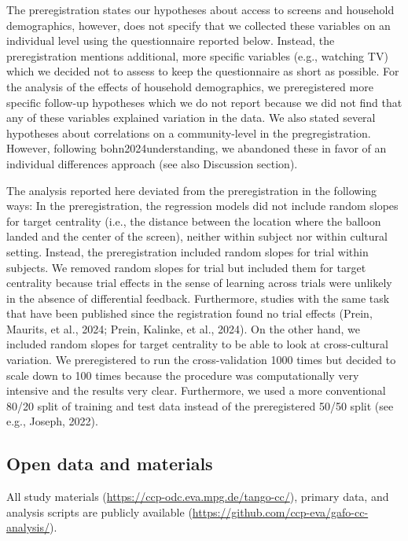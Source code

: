 \documentclass[
  man,floatsintext]{apa7}
\begin{document}
The preregistration states our hypotheses about access to screens and household demographics, however, does not specify that we collected these variables on an individual level using the questionnaire reported below. Instead, the preregistration mentions additional, more specific variables (e.g., watching TV) which we decided not to assess to keep the questionnaire as short as possible. For the analysis of the effects of household demographics, we preregistered more specific follow-up hypotheses which we do not report because we did not find that any of these variables explained variation in the data. We also stated several hypotheses about correlations on a community-level in the pregregistration. However, following bohn2024understanding, we abandoned these in favor of an individual differences approach (see also Discussion section).

The analysis reported here deviated from the preregistration in the following ways: In the preregistration, the regression models did not include random slopes for target centrality (i.e., the distance between the location where the balloon landed and the center of the screen), neither within subject nor within cultural setting. Instead, the preregistration included random slopes for trial within subjects. We removed random slopes for trial but included them for target centrality because trial effects in the sense of learning across trials were unlikely in the absence of differential feedback. Furthermore, studies with the same task that have been published since the registration found no trial effects (Prein, Maurits, et al., 2024; Prein, Kalinke, et al., 2024). On the other hand, we included random slopes for target centrality to be able to look at cross-cultural variation. We preregistered to run the cross-validation 1000 times but decided to scale down to 100 times because the procedure was computationally very intensive and the results very clear. Furthermore, we used a more conventional 80/20 split of training and test data instead of the preregistered 50/50 split (see e.g., Joseph, 2022).

\subsection{Open data and materials}\label{open-data-and-materials}

All study materials (\url{https://ccp-odc.eva.mpg.de/tango-cc/}), primary data, and analysis scripts are publicly available (\url{https://github.com/ccp-eva/gafo-cc-analysis/}).
\end{document}
